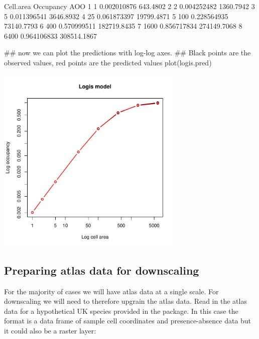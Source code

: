 \documentclass{article}[12pt, a4paper]
\begin{document}
\begin{Schunk}
\begin{Soutput}
  Cell.area   Occupancy         AOO
1         1 0.002010876    643.4802
2         2 0.004252482   1360.7942
3         5 0.011396541   3646.8932
4        25 0.061873397  19799.4871
5       100 0.228564935  73140.7793
6       400 0.570999511 182719.8435
7      1600 0.856717834 274149.7068
8      6400 0.964106833 308514.1867
\end{Soutput}
\end{Schunk}
\begin{Schunk}
\begin{Sinput}
## now we can plot the predictions with log-log axes.
## Black points are the observed values, red points are the predicted values
plot(logis.pred)
\end{Sinput}
\end{Schunk}
{\centering 
\includegraphics[width=9cm]{Downscaling-downscale6} \par
}

\subsection{Preparing atlas data for downscaling}
For the majority of cases we will have atlas data at a single scale. For downscaling we will need to therefore upgrain the atlas data. Read in the atlas data for a hypothetical UK species provided in the package. In this case the format is a data frame of sample cell coordinates and presence-absence data but it could also be a raster layer:
\end{document}
